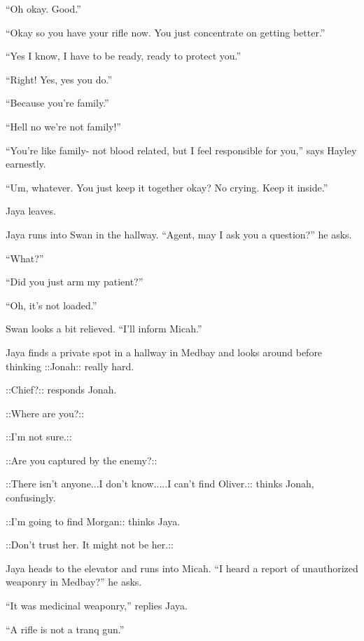 ``Oh okay.  Good.''

``Okay so you have your rifle now.  You just concentrate on getting better.''

``Yes I know, I have to be ready, ready to protect you.''

``Right!  Yes, yes you do.''

``Because you're family.''

``Hell no we're not family!''

``You're like family- not blood related, but I feel responsible for you,'' says Hayley earnestly.

``Um, whatever.  You just keep it together okay?  No crying.  Keep it inside.''

Jaya leaves.





Jaya runs into Swan in the hallway.  ``Agent, may I ask you a question?'' he asks.

``What?''

``Did you just arm my patient?'' 

``Oh, it's not loaded.''

Swan looks a bit relieved. ``I'll inform Micah.''



Jaya finds a private spot in a hallway in Medbay and looks around before thinking  {\color[RGB]{255,0,0}::Jonah::}  really hard.

 {\color[RGB]{0,0,255}::Chief?::}  responds Jonah.

 {\color[RGB]{255,0,0}::Where are you?::} 

 {\color[RGB]{0,0,255}::I'm not sure.::} 

 {\color[RGB]{255,0,0}::Are you captured by the enemy?::} 

 {\color[RGB]{0,0,255}::There isn't anyone...I don't know.....I can't find Oliver.::}  thinks Jonah, confusingly.

 {\color[RGB]{255,0,0}::I'm going to find Morgan:: } thinks Jaya.

 {\color[RGB]{0,0,255}::Don't trust her.  It might not be her.::} 



Jaya heads to the elevator and runs into Micah.  ``I heard a report of unauthorized weaponry in Medbay?'' he asks.

``It was medicinal weaponry,'' replies Jaya.

``A rifle is not a tranq gun.''

